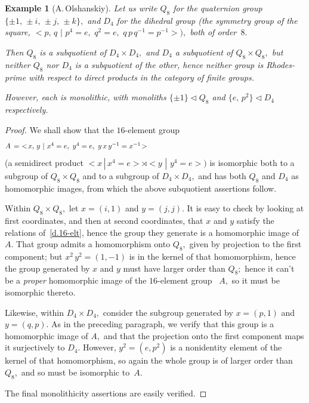 \documentclass{amsart}
\newtheorem{example}[theorem]{Example}
\numberwithin{equation}{section}
\numberwithin{theorem}{section}
\begin{document}
\begin{example}[A.\,Olshanskiy]\label{E.Q8,D4}
Let us write $Q_8$ for the quaternion group
$\{\pm 1,\,\pm i,\,\pm j,\,\pm k\},$
and $D_4$ for the dihedral group {\rm(}the symmetry group of the square,
$<\!p,\,q\,\,|\,\,p^4=e,\,\,q^2=e,\,\,q\,p\,q^{-1}=p^{-1}\!\!>),$
both of order~$8.$

Then $Q_8$ is a subquotient of $D_4\times D_4,$
and $D_4$ a subquotient of $Q_8\times Q_8,$
but neither $Q_8$ nor $D_4$ is a subquotient of the other, hence
neither group is Rhodes-prime with respect to direct products
in the category of finite groups.

However, each is monolithic, with monoliths
$\{\pm 1\}\lhd Q_8$ and $\{e,\,p^2\}\lhd D_4$ respectively.
\end{example}

\begin{proof}
We shall show that the $\!16\!$-element group
%
\begin{equation}\begin{minipage}[c]{35pc}\label{d.16-elt}
$A\,=~<\!x,\,y\,\,|\,\,x^4=e,\,\,y^4=e,\,\,y\,x\,y^{-1}=x^{-1}\!>$
\end{minipage}\end{equation}
%
(a semidirect product
$<\!x\,|\,x^4=e\!>\rtimes<\!y\,\,|\,\,y^4=e\!>)$
is isomorphic both to a subgroup of $Q_8\times Q_8$
and to a subgroup of $D_4\times D_4,$ and
has both $Q_8$ and $D_4$ as homomorphic images,
from which the above subquotient assertions follow.

Within $Q_8\times Q_8,$ let $x=(i,1)$ and $y=(j,j).$
It is easy to check by looking at first coordinates,
and then at second coordinates, that
$x$ and $y$ satisfy the relations of~\eqref{d.16-elt},
hence the group they generate is a homomorphic
image of~$A.$
That group admits a homomorphism onto $Q_8,$ given
by projection to the first component;
but $x^2\,y^2=(1,-1)$ is in the kernel of that homomorphism,
hence the group generated by $x$ and $y$ must have
larger order than $Q_8;$ hence it can't be a {\em proper}
homomorphic image of the $\!16\!$-element
group ~$A,$ so it must be isomorphic thereto.

Likewise, within $D_4\times D_4,$
consider the subgroup generated by $x=(p,1)$ and $y=(q,p).$
As in the preceding paragraph, we verify that this
group is a homomorphic image of $A,$ and that
the projection onto the first component maps it surjectively to $D_4.$
However, $y^2=(e,p^2)$ is a nonidentity element
of the kernel of that homomorphism, so again the whole group is
of larger order than $Q_8,$ and so must be isomorphic to~$A.$

The final monolithicity assertions are easily verified.
\end{proof}
\end{document}
